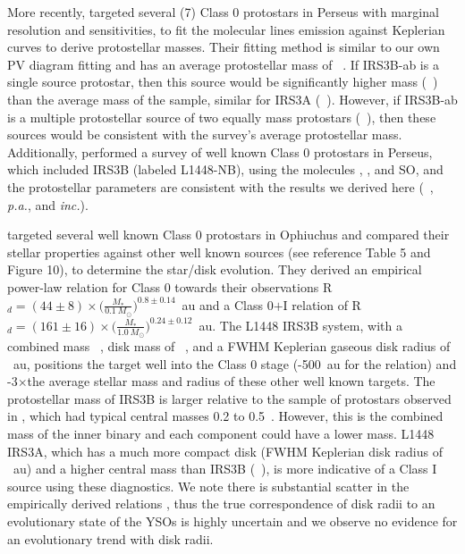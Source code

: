 \documentclass[twocolumn, 12pt, trackchanges]{aastex63}
\begin{document}
More recently, \citet{2020AA...635A..15M}\space targeted several (7) Class 0 protostars in Perseus with marginal resolution and sensitivities, to fit the molecular lines emission against Keplerian curves to derive protostellar masses. Their fitting method is similar to our own PV diagram fitting and has an average protostellar mass of ~\msun. If IRS3B-ab is a single source protostar, then this source would be significantly higher mass (\mstar{}~\msun) than the average mass of the sample, similar for IRS3A (\mstar{}~\msun). However, if IRS3B-ab is a multiple protostellar source of two equally mass protostars (\mstar{}~\msun), then these sources would be consistent with the survey's average protostellar mass.
Additionally, \citet{2020AA...635A..15M}\space performed a survey of well known Class 0 protostars in Perseus, which included IRS3B (labeled L1448-NB), using the molecules \tco, \ceo, and SO, and the protostellar parameters are consistent with the results we derived here (\mstar{}~\msun, \textit{p.a.}\deg, and \textit{inc.}\deg).

\citet[][]{2017ApJ...834..178Y} targeted several well known Class 0 protostars in Ophiuchus and compared their stellar properties against other well known sources (see reference Table 5 and Figure 10), to determine the star/disk evolution. They derived an empirical power-law relation for Class 0 towards their observations R$_{d}=(44\pm8)\times\big(\frac{M_{*}}{0.1~M_{\odot}}\big)^{0.8\pm0.14}$~au and a Class 0$+$I relation of R$_{d}=(161\pm16)\times\big(\frac{M_{*}}{1.0~M_{\odot}}\big)^{0.24\pm0.12}$~au. The L1448 IRS3B system, with a combined mass ~\solm, disk mass of ~\solm, and a FWHM Keplerian gaseous disk radius of ~au, positions the target well into the Class 0 stage (-500~au for the \citet[][]{2017ApJ...834..178Y} relation) and -3$\times$\space the average stellar mass and radius of these other well known targets. The protostellar mass of IRS3B is larger relative to the sample of protostars observed in \citet[][]{2017ApJ...834..178Y}, which had typical central masses 0.2 to 0.5~\solm. However, this is the combined mass of the inner binary and each component could have a lower mass. L1448 IRS3A, which has a much more compact disk (FWHM Keplerian disk radius of ~au) and a higher central mass than IRS3B (~\solm), is more indicative of a Class I source using these diagnostics. We note there is substantial scatter in the empirically derived relations \citep{2020ApJ...890..130T}, thus the true correspondence of disk radii to an evolutionary state of the YSOs is highly uncertain and we observe no evidence for an evolutionary trend with disk radii.
\end{document}
